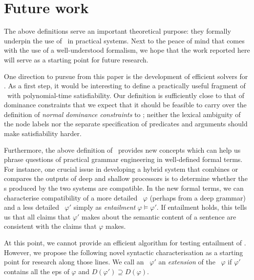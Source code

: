 \section{Future work}
\label{sec:entailment}

The above definitions serve an important theoretical purpose: they
formally underpin the use of \rmrs\ in practical
systems.  Next to the peace of mind that comes with the use of a
well-understood formalism, we hope that the work reported here will
serve as a starting point for future research.

One direction to pursue from this paper is the
development of efficient solvers for \rmrs.  As a first step, it would
be interesting to define a practically useful fragment of \rmrs\ with
polynomial-time satisfiability.  Our definition is sufficiently close
to that of dominance constraints that we expect that it should be
feasible to carry over the definition of \emph{normal dominance
  constraints} \cite{Althaus_etal:JoA} to \rmrs; neither the lexical
ambiguity of the node labels nor the separate specification of
predicates and arguments should make satisfiability harder.

Furthermore, the above definition of \rmrs\ provides new concepts
which can help us phrase questions of practical grammar engineering in
well-defined formal terms.  For instance, one crucial issue in
developing a hybrid system that combines or compares the outputs of
deep and shallow processors is to determine whether the \rmrs s
produced by the two systems are compatible.  In the new formal terms,
we can characterise compatibility of a more detailed \rmrs\ $\varphi$
(perhaps from a deep grammar) and a less detailed \rmrs\ $\varphi'$
simply as \emph{entailment} $\varphi \models \varphi'$.  If entailment
holds, this tells us that all claims that $\varphi'$ makes about the
semantic content of a sentence are consistent with the claims that
$\varphi$ makes.

At this point, we cannot provide an efficient algorithm for testing
entailment of \rmrs.  However, we propose the following novel
syntactic characterisation as a starting point for research along
those lines. We call an \rmrs\ $\varphi'$ an \emph{extension} of the
\rmrs\ $\varphi$ if $\varphi'$ contains all the {\sc ep}s of $\varphi$ and
$D(\varphi') \supseteq D(\varphi)$.

